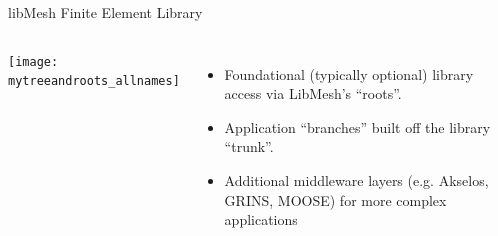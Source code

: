 \documentclass[mathserif]{beamer}
\begin{document}
\begin{frame}{libMesh Finite Element Library}
\end{frame}

\begin{frame}[t]
  \begin{columns}
    \begin{center}
      \texttt{[image: mytreeandroots\_allnames]}
    \end{center}
    \begin{itemize}
      \item Foundational (typically optional) library access via LibMesh's ``roots''.
      \item Application ``branches'' built off the library ``trunk''.
      \item Additional middleware layers (e.g. Akselos, GRINS, MOOSE) for more complex applications
    \end{itemize}
  \end{columns}

\end{frame}
\end{document}
